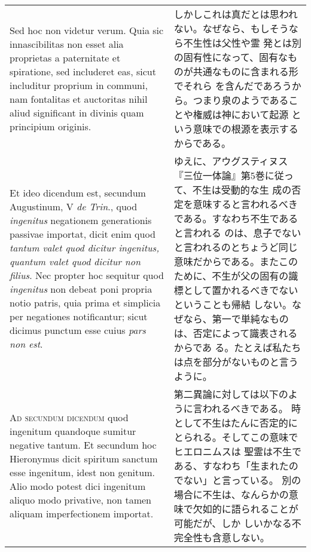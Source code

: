\documentclass[10pt]{jsarticle} %
\begin{document}
\begin{longtable}{p{21em}p{21em}}
\\

Sed hoc non
videtur verum. Quia sic innascibilitas non esset alia proprietas a
paternitate et spiratione, sed includeret eas, sicut includitur
proprium in communi, nam fontalitas et auctoritas nihil aliud
significant in divinis quam principium originis. 


&

しかしこれは真だとは思われない。なぜなら、もしそうなら不生性は父性や霊
 発とは別の固有性になって、固有なものが共通なものに含まれる形でそれら
 を含んだであろうから。つまり泉のようであることや権威は神において起源
 という意味での根源を表示するからである。

\\

Et ideo dicendum est,
secundum Augustinum, V {\itshape de Trin}., quod {\itshape ingenitus} negationem
generationis passivae importat, dicit enim quod {\itshape tantum valet quod
dicitur ingenitus, quantum valet quod dicitur non filius}. Nec propter
hoc sequitur quod {\itshape ingenitus} non debeat poni propria notio patris, quia
prima et simplicia per negationes notificantur; sicut dicimus punctum
esse cuius {\itshape pars non est}.


&

ゆえに、アウグスティヌス『三位一体論』第5巻に従って、不生は受動的な生
 成の否定を意味すると言われるべきである。すなわち不生であると言われる
 のは、息子でないと言われるのとちょうど同じ意味だからである。またこの
 ために、不生が父の固有の識標として置かれるべきでないということも帰結
 しない。なぜなら、第一で単純なものは、否定によって識表されるからであ
 る。たとえば私たちは点を部分がないものと言うように。

\\



{\scshape Ad secundum dicendum} quod ingenitum quandoque sumitur negative
tantum. Et secundum hoc Hieronymus dicit spiritum sanctum esse
ingenitum, idest non genitum. Alio modo potest dici ingenitum aliquo
modo privative, non tamen aliquam imperfectionem
importat. 

&

第二異論に対しては以下のように言われるべきである。
時として不生はたんに否定的にとられる。そしてこの意味でヒエロニムスは
聖霊は不生である、すなわち「生まれたのでない」と言っている。
別の場合に不生は、なんらかの意味で欠如的に語られることが可能だが、しか
 しいかなる不完全性も含意しない。

\\



\end{longtable}
\end{document}
